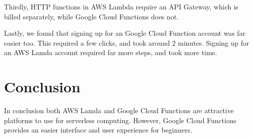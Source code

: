 \documentclass[10pt, conference]{IEEEtran}
\begin{document}
Thirdly, HTTP functions in AWS Lambda require an API Gateway, which is billed separately, while Google Cloud Functions does not. 

Lastly, we found that signing up for an Google Cloud Function account was far easier too. This required a few clicks, and took around 2 minutes. Signing up for an AWS Lamda account required far more steps, and took more time. 

\section{Conclusion}

In conclusion both AWS Lamda and Google Cloud Functions are attractive platforms to use for serverless computing. However, Google Cloud Functions provides an easier interface and user experience for beginners. 
\end{document}
